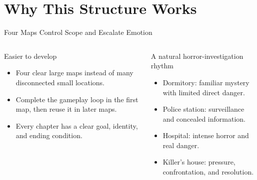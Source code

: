 \documentclass[aspectratio=169,10pt]{beamer}
\begin{document}
\section{Why This Structure Works}
\begin{frame}{Four Maps Control Scope and Escalate Emotion}
  \begin{columns}[T,onlytextwidth]
    \begin{block}{Easier to develop}
      \begin{itemize}
        \item Four clear large maps instead of many disconnected small locations.
        \item Complete the gameplay loop in the first map, then reuse it in later maps.
        \item Every chapter has a clear goal, identity, and ending condition.
      \end{itemize}
    \end{block}
    \begin{block}{A natural horror-investigation rhythm}
      \begin{itemize}
        \item Dormitory: familiar mystery with limited direct danger.
        \item Police station: surveillance and concealed information.
        \item Hospital: intense horror and real danger.
        \item Killer's house: pressure, confrontation, and resolution.
      \end{itemize}
    \end{block}
  \end{columns}
\end{frame}
\end{document}
